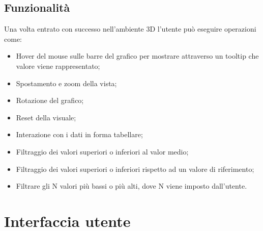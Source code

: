 \newpage


\subsection{Funzionalità}
Una volta entrato con successo nell'ambiente 3D l'utente può eseguire operazioni come:
\begin{itemize}
    \item Hover del mouse sulle barre del grafico per mostrare attraverso un tooltip che valore viene rappresentato;
    \item Spostamento e zoom della vista;
    \item Rotazione del grafico;
    \item Reset della visuale;
    \item Interazione con i dati in forma tabellare;
    \item Filtraggio dei valori superiori o inferiori al valor medio;
    \item Filtraggio dei valori superiori o inferiori rispetto ad un valore di riferimento;
    \item Filtrare gli N valori più bassi o più alti, dove N viene imposto dall'utente.
\end{itemize}

\section{Interfaccia utente}

